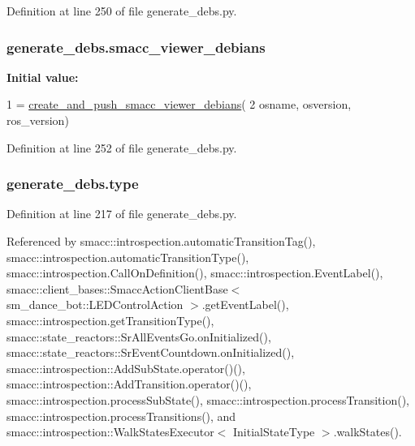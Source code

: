 Definition at line 250 of file generate\+\_\+debs.\+py.

\subsubsection[{\texorpdfstring{smacc\+\_\+viewer\+\_\+debians}{smacc_viewer_debians}}]{\setlength{\rightskip}{0pt plus 5cm}generate\+\_\+debs.\+smacc\+\_\+viewer\+\_\+debians}\hypertarget{namespacegenerate__debs_a545b249defac1bf82a09872513263f61}{}\label{namespacegenerate__debs_a545b249defac1bf82a09872513263f61}
{\bfseries Initial value\+:}
\begin{DoxyCode}
1 = \hyperlink{namespacegenerate__debs_a9a6167ed98fbdc7b1e1c56da5652cf19}{create\_and\_push\_smacc\_viewer\_debians}(
2         osname, osversion, ros\_version)
\end{DoxyCode}


Definition at line 252 of file generate\+\_\+debs.\+py.

\subsubsection[{\texorpdfstring{type}{type}}]{\setlength{\rightskip}{0pt plus 5cm}generate\+\_\+debs.\+type}\hypertarget{namespacegenerate__debs_a50bc9a7ecac9584553e089a448bcde58}{}\label{namespacegenerate__debs_a50bc9a7ecac9584553e089a448bcde58}


Definition at line 217 of file generate\+\_\+debs.\+py.



Referenced by smacc\+::introspection.\+automatic\+Transition\+Tag(), smacc\+::introspection.\+automatic\+Transition\+Type(), smacc\+::introspection.\+Call\+On\+Definition(), smacc\+::introspection.\+Event\+Label(), smacc\+::client\+\_\+bases\+::\+Smacc\+Action\+Client\+Base$<$ sm\+\_\+dance\+\_\+bot\+::\+L\+E\+D\+Control\+Action $>$.\+get\+Event\+Label(), smacc\+::introspection.\+get\+Transition\+Type(), smacc\+::state\+\_\+reactors\+::\+Sr\+All\+Events\+Go.\+on\+Initialized(), smacc\+::state\+\_\+reactors\+::\+Sr\+Event\+Countdown.\+on\+Initialized(), smacc\+::introspection\+::\+Add\+Sub\+State.\+operator()(), smacc\+::introspection\+::\+Add\+Transition.\+operator()(), smacc\+::introspection.\+process\+Sub\+State(), smacc\+::introspection.\+process\+Transition(), smacc\+::introspection.\+process\+Transitions(), and smacc\+::introspection\+::\+Walk\+States\+Executor$<$ Initial\+State\+Type $>$.\+walk\+States().

